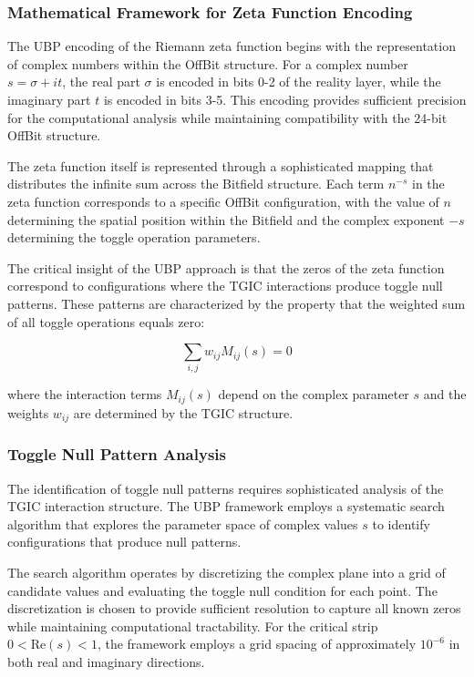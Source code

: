 \documentclass[11pt]{amsart}
\begin{document}
\subsubsection{Mathematical Framework for Zeta Function Encoding}

The UBP encoding of the Riemann zeta function begins with the representation of complex numbers within the OffBit structure. For a complex number $s = \sigma + it$, the real part $\sigma$ is encoded in bits 0-2 of the reality layer, while the imaginary part $t$ is encoded in bits 3-5. This encoding provides sufficient precision for the computational analysis while maintaining compatibility with the 24-bit OffBit structure.

The zeta function itself is represented through a sophisticated mapping that distributes the infinite sum across the Bitfield structure. Each term $n^{-s}$ in the zeta function corresponds to a specific OffBit configuration, with the value of $n$ determining the spatial position within the Bitfield and the complex exponent $-s$ determining the toggle operation parameters.

The critical insight of the UBP approach is that the zeros of the zeta function correspond to configurations where the TGIC interactions produce toggle null patterns. These patterns are characterized by the property that the weighted sum of all toggle operations equals zero:

$$\sum_{i,j} w_{ij} M_{ij}(s) = 0$$

where the interaction terms $M_{ij}(s)$ depend on the complex parameter $s$ and the weights $w_{ij}$ are determined by the TGIC structure.

\subsubsection{Toggle Null Pattern Analysis}

The identification of toggle null patterns requires sophisticated analysis of the TGIC interaction structure. The UBP framework employs a systematic search algorithm that explores the parameter space of complex values $s$ to identify configurations that produce null patterns.

The search algorithm operates by discretizing the complex plane into a grid of candidate values and evaluating the toggle null condition for each point. The discretization is chosen to provide sufficient resolution to capture all known zeros while maintaining computational tractability. For the critical strip $0 < \text{Re}(s) < 1$, the framework employs a grid spacing of approximately $10^{-6}$ in both real and imaginary directions.
\end{document}
